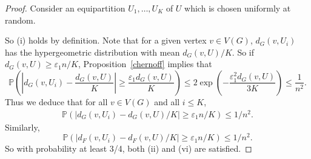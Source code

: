 \documentclass{memo-l}
\def\COMMENT#1{}
\def\eps{\varepsilon}
\def\pr{\mathbb{P}}
\numberwithin{section}{chapter}
\numberwithin{equation}{section}
\numberwithin{firstthm}{section}
\numberwithin{figure}{section}
\begin{document}
\begin{proof}
Consider an equipartition $U_1, \dots , U_K$ of $U$ which is chosen uniformly at random.%
     \COMMENT{the previous binomial approach had the problem that at some stage the argument involved a sum over a random variable.
The present one also seems simpler.}
So (i) holds by definition.
Note that for a given vertex $v \in V(G)$, $d_G(v,U_i)$ has the hypergeometric distribution
with mean $d_G(v, U)/K$.
So if $d_G(v, U) \ge \eps_1 n/K$,  Proposition~\ref{chernoff} implies that
$$
                \pr \left( \left| d_G(v,U_{i}) -  \frac{d_G(v, U)}{K} \right|  \ge \frac{\eps_1 d_G(v,U) }{K}\right) 
  \le 2 \exp \left(- \frac{\eps_1^2 d_G(v,U)}{3K} \right)
\le \frac{1}{n^2}.
$$
Thus we deduce that for all $v \in V(G)$ and all $i \le K$,
\begin{align*} %
                \pr \left( \left| d_G(v,U_{i}) -  d_G(v, U)/K \right|  \ge \eps_1 n /K \right) 
\le 1/n^2.
\end{align*}
Similarly, 
\begin{equation*} %
\pr \left( \left| d_F(v,U_{i}) -  d_F(v, U)/K \right|  \ge \eps_1 n /K \right) \le 1/n^2.
\end{equation*}
So with probability at least 3/4, both (ii) and (vi) are satisfied.
 

\end{proof}
\end{document}
